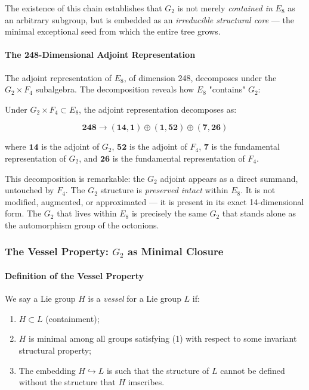\documentclass[12pt,a4paper]{article}
\begin{document}
The existence of this chain establishes that $G_2$ is not merely \emph{contained in} $E_8$ as an arbitrary subgroup, but is embedded as an \emph{irreducible structural core} --- the minimal exceptional seed from which the entire tree grows.

\paragraph{The 248-Dimensional Adjoint Representation}

The adjoint representation of $E_8$, of dimension 248, decomposes under the $G_2 \times F_4$ subalgebra. The decomposition reveals how $E_8$ "contains" $G_2$:

Under $G_2 \times F_4 \subset E_8$, the adjoint representation decomposes as:

\[\mathbf{248} \to (\mathbf{14}, \mathbf{1}) \oplus (\mathbf{1}, \mathbf{52}) \oplus (\mathbf{7}, \mathbf{26})\]

where $\mathbf{14}$ is the adjoint of $G_2$, $\mathbf{52}$ is the adjoint of $F_4$, $\mathbf{7}$ is the fundamental representation of $G_2$, and $\mathbf{26}$ is the fundamental representation of $F_4$.

This decomposition is remarkable: the $G_2$ adjoint appears as a direct summand, untouched by $F_4$. The $G_2$ structure is \emph{preserved intact} within $E_8$. It is not modified, augmented, or approximated --- it is present in its exact 14-dimensional form. The $G_2$ that lives within $E_8$ is precisely the same $G_2$ that stands alone as the automorphism group of the octonions.

\subsubsection{The Vessel Property: $G_2$ as Minimal Closure}

\paragraph{Definition of the Vessel Property}

We say a Lie group $H$ is a \emph{vessel} for a Lie group $L$ if:

\begin{enumerate}
    \item $H \subset L$ (containment);
    \item $H$ is minimal among all groups satisfying (1) with respect to some invariant structural property;
    \item The embedding $H \hookrightarrow L$ is such that the structure of $L$ cannot be defined without the structure that $H$ imscribes.
\end{enumerate}
\end{document}
